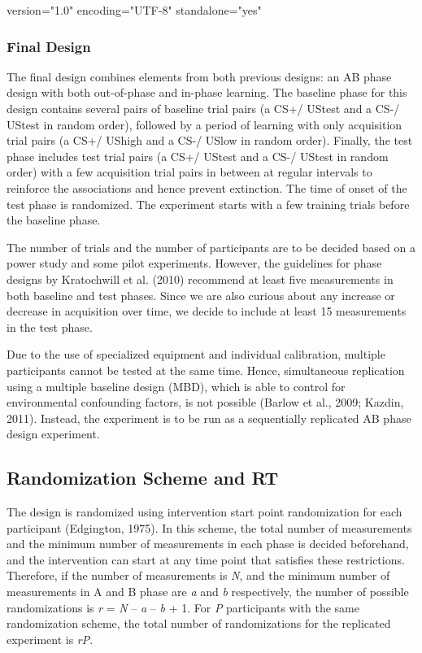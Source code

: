 version="1.0" encoding="UTF-8" standalone="yes" \documentclass{article}
\begin{document}
\subsubsection{Final Design}

The final design combines elements from both previous designs: an AB phase design with both out-of-phase and in-phase learning. The baseline phase for this design contains several pairs of baseline trial pairs (a CS+/ UStest and a CS-/ UStest in random order), followed by a period of learning with only acquisition trial pairs (a CS+/ UShigh and a CS-/ USlow in random order). Finally, the test phase includes test trial pairs (a CS+/ UStest and a CS-/ UStest in random order) with a few acquisition trial pairs in between at regular intervals to reinforce the associations and hence prevent extinction. The time of onset of the test phase is randomized. The experiment starts with a few training trials before the baseline phase. 

The number of trials and the number of participants are to be decided based on a power study and some pilot experiments. However, the guidelines for phase designs by Kratochwill et al. (2010) recommend at least five measurements in both baseline and test phases. Since we are also curious about any increase or decrease in acquisition over time, we decide to include at least 15 measurements in the test phase. 

Due to the use of specialized equipment and individual calibration, multiple participants cannot be tested at the same time. Hence, simultaneous replication using a multiple baseline design (MBD), which is able to control for environmental confounding factors, is not possible (Barlow et al., 2009; Kazdin, 2011). Instead, the experiment is to be run as a sequentially replicated AB phase design experiment. 

\subsection{Randomization Scheme and RT}

The design is randomized using intervention start point randomization for each participant (Edgington, 1975). In this scheme, the total number of measurements and the minimum number of measurements in each phase is decided beforehand, and the intervention can start at any time point that satisfies these restrictions. Therefore, if the number of measurements is \emph{N}, and the minimum number of measurements in A and B phase are \emph{a} and \emph{b} respectively, the number of possible randomizations is \emph{r} = \emph{N} -- \emph{a} -- \emph{b} + 1. For \emph{P} participants with the same randomization scheme, the total number of randomizations for the replicated experiment is \emph{r}\emph{P}. 
\end{document}
